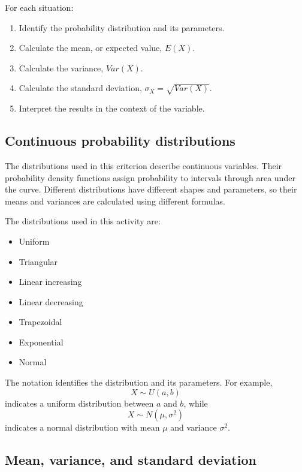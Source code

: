 For each situation:
\begin{enumerate}
	\item Identify the probability distribution and its parameters.
	\item Calculate the mean, or expected value, $E(X)$.
	\item Calculate the variance, $Var(X)$.
	\item Calculate the standard deviation,
	$\sigma_X=\sqrt{Var(X)}$.
	\item Interpret the results in the context of the variable.
\end{enumerate}

	
	\subsection{Continuous probability distributions}\label{sec:c4-intro-distributions}
	
	The distributions used in this criterion describe continuous variables.  Their
	probability density functions assign probability to intervals through area
	under the curve.  Different distributions have different shapes and parameters,
	so their means and variances are calculated using different formulas.
	
	The distributions used in this activity are:
	\begin{itemize}
		\item Uniform
		\item Triangular
		\item Linear increasing
		\item Linear decreasing
		\item Trapezoidal
		\item Exponential
		\item Normal
	\end{itemize}
	
	The notation identifies the distribution and its parameters.  For example,
	\[
	X\sim U(a,b)
	\]
	indicates a uniform distribution between $a$ and $b$, while
	\[
	X\sim N(\mu,\sigma^2)
	\]
	indicates a normal distribution with mean $\mu$ and variance $\sigma^2$.
	
	\subsection{Mean, variance, and standard deviation}\label{sec:c4-intro-method}
	
